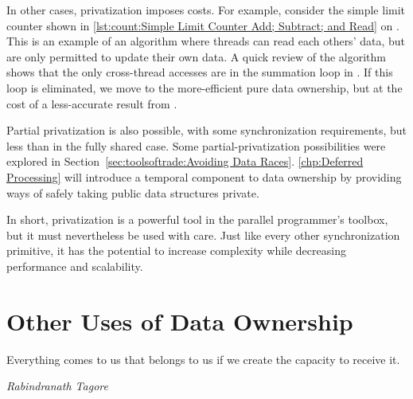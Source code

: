 In other cases, privatization imposes costs.
For example, consider the simple limit counter shown in
\cref{lst:count:Simple Limit Counter Add; Subtract; and Read} on
.
This is an example of an algorithm where threads can read each others'
data, but are only permitted to update their own data.
A quick review of the algorithm shows that the only cross-thread
accesses are in the summation loop in .
If this loop is eliminated, we move to the more-efficient pure
data ownership, but at the cost of a less-accurate result
from .

\QuickQuizEnd

Partial privatization is also possible, with some synchronization
requirements, but less than in the fully shared case.
Some partial-privatization possibilities were explored in
Section~\ref{sec:toolsoftrade:Avoiding Data Races}.
\cref{chp:Deferred Processing} will introduce a temporal component
to data ownership by providing ways of safely taking public data
structures private.

In short, privatization is a powerful tool in the parallel programmer's
toolbox, but it must nevertheless be used with care.
Just like every other synchronization primitive, it has the potential
to increase complexity while decreasing performance and scalability.

\section{Other Uses of Data Ownership}
\label{sec:owned:Other Uses of Data Ownership}
%
\epigraph{Everything comes to us that belongs to us if we create the
	  capacity to receive it.}
	 {\emph{Rabindranath Tagore}}

